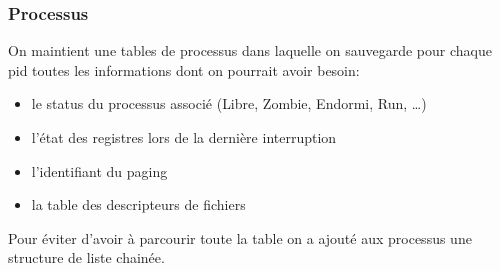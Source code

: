\documentclass[10pt,a4paper]{beamer}
\begin{document}
\begin{frame}
  \frametitle{Processus}

  On maintient une tables de processus dans laquelle on sauvegarde pour chaque pid toutes les informations dont on pourrait avoir besoin:

  \begin{itemize}
  \item le status du processus associé (\textrm{Libre}, \textrm{Zombie}, \textrm{Endormi}, \textrm{Run}, \ldots)
  \item l'état des registres lors de la dernière interruption
  \item l'identifiant du paging
  \item la table des descripteurs de fichiers
  \end{itemize}

  Pour éviter d'avoir à parcourir toute la table on a ajouté aux processus une structure de liste chainée.



\end{frame}
\end{document}
